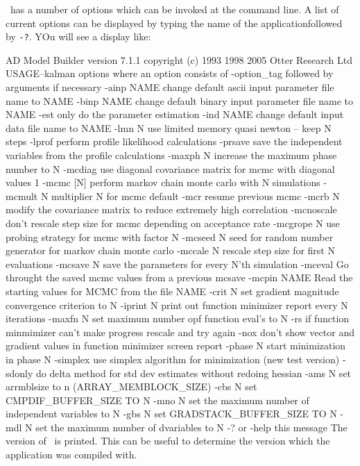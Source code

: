 
\ADM\ has a number of options which can be invoked at the command line.
A list of current options can be displayed by typing the name of the applicationfollowed by {\tt -?}. YOu will see a display like:

\beginexample
 AD Model Builder version 7.1.1 copyright (c) 1993 1998 2005 Otter Research Ltd
 USAGE--kalman options
 where an option consists of -option_tag followed by arguments if necessary
 -ainp NAME      change default ascii input parameter file name to NAME
 -binp NAME      change default binary input parameter file name to NAME
 -est            only do the parameter estimation
 -ind NAME       change default input data file name to NAME
 -lmn N          use limited memory quasi newton -- keep N steps
 -lprof          perform profile likelihood calculations
 -prsave         save the independent variables from the profile calculations
 -maxph N        increase the maximum phase number to N
 -mcdiag         use diagonal covariance matrix for mcmc with diagonal values 1
 -mcmc [N]       perform markov chain monte carlo with N simulations
 -mcmult N       multiplier N for mcmc default
 -mcr            resume previous mcmc
 -mcrb N         modify the covariance matrix to reduce extremely high correlation      
 -mcnoscale      don't rescale step size for mcmc depending on acceptance rate
 -mcgrope N      use probing strategy for mcmc with factor N
 -mcseed N       seed for random number generator for markov chain monte carlo
 -mccale N       rescale step size for first N evaluations
 -mcsave N       save the parameters for every N'th simulation
 -mceval         Go throught the saved mcmc values from a previous mcsave
 -mcpin NAME      Read the starting values for MCMC from the file NAME
 -crit N         set gradient magnitude convergence criterion to N
 -iprint N       print out function minimizer report every N iterations
 -maxfn N        set maximum number opf function eval's to N
 -rs             if function minmimizer can't make progress rescale and try again
 -nox            don't show vector and gradient values in function minimizer screen report
 -phase N        start minimization in phase N
 -simplex        use simplex algorithm for minimization (new test version)
 -sdonly         do delta method for std dev estimates without redoing hessian
 -ams N          set arrmblsize to n (ARRAY_MEMBLOCK_SIZE) 
 -cbs N          set CMPDIF_BUFFER_SIZE TO N 
 -mno N          set the maximum number of independent variables to N
 -gbs N          set GRADSTACK_BUFFER_SIZE TO N 
 -mdl N          set the maximum number of dvariables to N
 -? or -help     this message
\endexample
The version of \ADM\ is printed. This can be useful to determine
the version which the application was compiled with.

